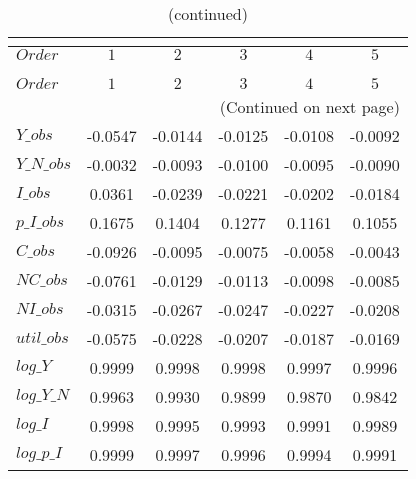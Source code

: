  
\begin{center}
\begin{longtable}{lccccc} 
\caption{COEFFICIENTS OF AUTOCORRELATION}\\
 \label{Table:th_autocorr_matrix}\\
\toprule 
$Order      $	 & 	 $          1$	 & 	 $          2$	 & 	 $          3$	 & 	 $          4$	 & 	 $          5$\\
\midrule \endfirsthead 
\caption{(continued)}\\
 \toprule \\ 
$Order      $	 & 	 $          1$	 & 	 $          2$	 & 	 $          3$	 & 	 $          4$	 & 	 $          5$\\
\midrule \endhead 
\midrule \multicolumn{6}{r}{(Continued on next page)} \\ \bottomrule \endfoot 
\bottomrule \endlastfoot 
$Y\_obs     $	 & 	    -0.0547	 & 	    -0.0144	 & 	    -0.0125	 & 	    -0.0108	 & 	    -0.0092 \\ 
$Y\_N\_obs  $	 & 	    -0.0032	 & 	    -0.0093	 & 	    -0.0100	 & 	    -0.0095	 & 	    -0.0090 \\ 
$I\_obs     $	 & 	     0.0361	 & 	    -0.0239	 & 	    -0.0221	 & 	    -0.0202	 & 	    -0.0184 \\ 
$p\_I\_obs  $	 & 	     0.1675	 & 	     0.1404	 & 	     0.1277	 & 	     0.1161	 & 	     0.1055 \\ 
$C\_obs     $	 & 	    -0.0926	 & 	    -0.0095	 & 	    -0.0075	 & 	    -0.0058	 & 	    -0.0043 \\ 
$NC\_obs    $	 & 	    -0.0761	 & 	    -0.0129	 & 	    -0.0113	 & 	    -0.0098	 & 	    -0.0085 \\ 
$NI\_obs    $	 & 	    -0.0315	 & 	    -0.0267	 & 	    -0.0247	 & 	    -0.0227	 & 	    -0.0208 \\ 
$util\_obs  $	 & 	    -0.0575	 & 	    -0.0228	 & 	    -0.0207	 & 	    -0.0187	 & 	    -0.0169 \\ 
$log\_Y     $	 & 	     0.9999	 & 	     0.9998	 & 	     0.9998	 & 	     0.9997	 & 	     0.9996 \\ 
$log\_Y\_N  $	 & 	     0.9963	 & 	     0.9930	 & 	     0.9899	 & 	     0.9870	 & 	     0.9842 \\ 
$log\_I     $	 & 	     0.9998	 & 	     0.9995	 & 	     0.9993	 & 	     0.9991	 & 	     0.9989 \\ 
$log\_p\_I  $	 & 	     0.9999	 & 	     0.9997	 & 	     0.9996	 & 	     0.9994	 & 	     0.9991 \\ 

\end{longtable}
\end{center}
